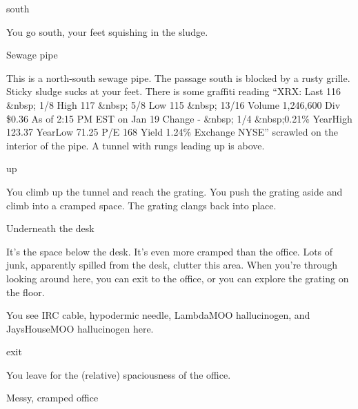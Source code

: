 \documentclass[10pt,twoside,openleft]{memoir}
\begin{document}
{south

You go south, your feet squishing in the sludge.

Sewage pipe

This is a north-south sewage pipe.  The passage south is blocked by a rusty
 grille.  Sticky sludge sucks at your feet.  There is some graffiti reading
 ``XRX: Last 116 \&nbsp; 1/8 High 117 \&nbsp; 5/8 Low 115 \&nbsp; 13/16 Volume
 1,246,600 Div \$0.36 As of  2:15 PM EST on Jan 19 Change - \&nbsp; 1/4
 \&nbsp;0.21\% YearHigh 123.37 YearLow 71.25 P/E 168 Yield 1.24\% Exchange NYSE''
 scrawled on the interior of the pipe.  A tunnel with rungs leading up is
 above.
 
up

You climb up the tunnel and reach the grating.  You push the grating aside and
 climb into a cramped space.  The grating clangs back into place.

Underneath the desk

It's the space below the desk.  It's even more cramped than the office.  Lots
 of junk, apparently spilled from the desk, clutter this area.  When you're
 through looking around here, you can exit to the office, or you can explore
 the grating on the floor.

You see IRC cable, hypodermic needle, LambdaMOO hallucinogen, and JaysHouseMOO hallucinogen here.

exit

You leave for the (relative) spaciousness of the office.

Messy, cramped office

}
\end{document}

